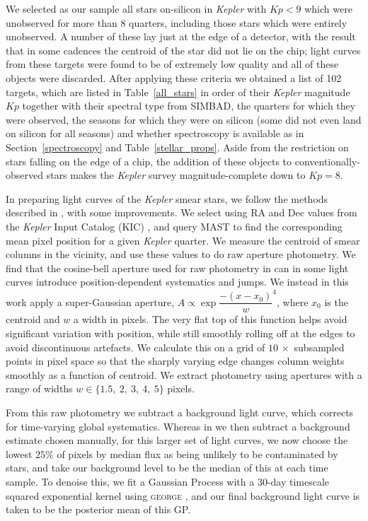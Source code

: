 \documentclass[a4paper,fleqn,usenatbib]{mnras}
\newcommand{\kepler}{\emph{Kepler}\xspace}
\begin{document}
We selected as our sample all stars on-silicon in \kepler with $Kp<9$ which were unobserved for more than $8$ quarters, including those stars which were entirely unobserved. A number of these lay just at the edge of a detector, with the result that in some cadences the centroid of the star did not lie on the chip; light curves from these targets were found to be of extremely low quality and all of these objects were discarded. After applying these criteria we obtained a list of 102 targets, which are listed in Table~\ref{all_stars} in order of their \kepler magnitude $Kp$ together with their spectral type from SIMBAD, the quarters for which they were observed, the seasons for which they were on silicon (some did not even land on silicon for all seasons) and whether spectroscopy is available as in Section~\ref{spectroscopy} and Table~\ref{stellar_props}. Aside from the restriction on stars falling on the edge of a chip, the addition of these objects to conventionally-observed stars makes the \kepler survey magnitude-complete down to $Kp=8$. 

In preparing light curves of the \kepler smear stars, we follow the methods described in \citet{smear}, with some improvements. We select using RA and Dec values from the \kepler Input Catalog (KIC) \citep{kic}, and query MAST to find the corresponding mean pixel position for a given \kepler quarter. We measure the centroid of smear columns in the vicinity, and use these values to do raw aperture photometry. We find that the cosine-bell aperture used for raw photometry in \citet{smear} can in some light curves introduce position-dependent systematics and jumps. We instead in this work apply a super-Gaussian aperture, $A \propto \exp{\dfrac{-(x-x_0)}{w} ^ 4}$, where $x_0$ is the centroid and $w$ a width in pixels. The very flat top of this function helps avoid significant variation with position, while still smoothly rolling off at the edges to avoid discontinuous artefacts. We calculate this on a grid of $10\,\times$ subsampled points in pixel space so that the sharply varying edge changes column weights smoothly as a function of centroid. We extract photometry using apertures with a range of widths $w \in\{1.5,~2,~3,~4,~5\}$ pixels.

From this raw photometry we subtract a background light curve, which corrects for time-varying global systematics. Whereas in \citet{smear} we then subtract a background estimate chosen manually, for this larger set of light curves, we now choose the lowest $25\%$ of pixels by median flux as being unlikely to be contaminated by stars, and take our background level to be the median of this at each time sample. To denoise this, we fit a Gaussian Process with a 30-day timescale squared exponential kernel using \textsc{george} \citep{hodlr}, and our final background light curve is taken to be the posterior mean of this GP. 
\end{document}

